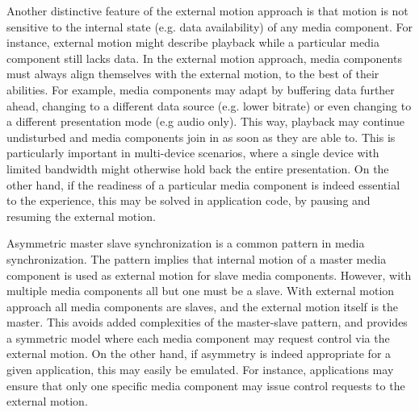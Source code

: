
Another distinctive feature of the external motion approach is that motion is
not sensitive to the internal state (e.g. data availability) of any media
component. For instance, external motion might describe playback while a
particular media component still lacks data. In the external motion approach,
media components must always align themselves with the external motion, to the
best of their abilities. For example, media components may adapt by buffering
data further ahead, changing to a different data source (e.g. lower bitrate)
or even changing to a different presentation mode (e.g audio only). This way,
playback may continue undisturbed and media components join in as soon as they
are able to. This is particularly important in multi-device scenarios, where a
single device with limited bandwidth might otherwise hold back the entire
presentation. On the other hand, if the readiness of a particular media
component is indeed essential to the experience, this may be solved in
application code, by pausing and resuming the external motion.



Asymmetric master slave synchronization is a common pattern in media
synchronization. The pattern implies that internal motion of a master media
component is used as external motion for slave media components. However, with
multiple media components all but one must be a slave. With
external motion approach all media components are slaves, and the external
motion itself is the master. This avoids added complexities of the master-slave 
pattern, and provides a symmetric model where each media component may
request control via the external motion. On the other hand, if asymmetry is
indeed appropriate for a given application, this may easily be emulated. For
instance, applications may ensure that only one specific media component may
issue control requests to the external motion.


